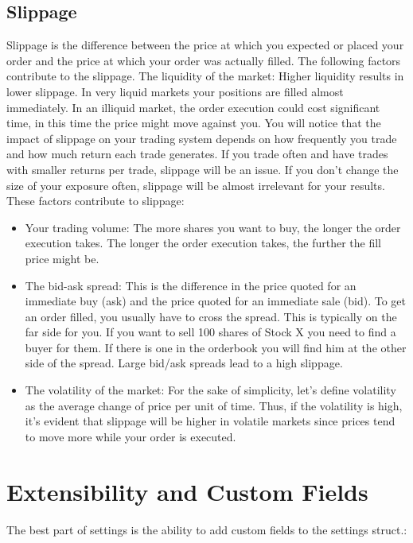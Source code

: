 \documentclass[letterpaper,10pt,english]{sphinxmanual}
\begin{document}
\subsection{Slippage}
\label{settings:slippage}
Slippage is the difference between the price at which you expected or placed your order and the price at which your order was actually filled. The following factors contribute to the slippage. The liquidity of the market: Higher liquidity results in lower slippage. In very liquid markets your positions are filled almost immediately. In an illiquid market, the order execution could cost significant time, in this time the price might move against you. You will notice that the impact of slippage on your trading system depends on how frequently you trade and how much return each trade generates. If you trade often and have trades with smaller returns per trade, slippage will be an issue. If you don't change the size of your exposure often, slippage will be almost irrelevant for your results. These factors contribute to slippage:
\begin{itemize}
\item {} 
Your trading volume: The more shares you want to buy, the longer the order execution takes. The longer the order execution takes, the further the fill price might be.

\item {} 
The bid-ask spread: This is the difference in the price quoted for an immediate buy (ask) and the price quoted for an immediate sale (bid). To get an order filled, you usually have to cross the spread. This is typically on the far side for you. If you want to sell 100 shares of Stock X you need to find a buyer for them. If there is one in the orderbook you will find him at the other side of the spread. Large bid/ask spreads lead to a high slippage.

\item {} 
The volatility of the market: For the sake of simplicity, let's define volatility as the average change of price per unit of time. Thus, if the volatility is high, it's evident that slippage will be higher in volatile markets since prices tend to move more while your order is executed.

\end{itemize}


\section{Extensibility and Custom Fields}
\label{settings:extensibility-and-custom-fields}
The best part of settings is the ability to add custom fields to the settings struct.:
\end{document}
